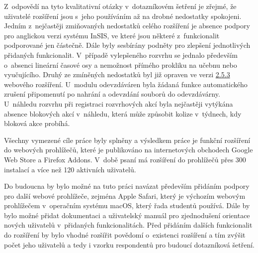 Z~odpovědí na tyto kvalitativní otázky v~dotazníkovém šetření je zřejmé, že uživatelé rozšíření jsou s~jeho používáním až na drobné nedostatky spokojeni. Jedním z~nejčastěji zmiňovaných nedostatků celého rozšíření je absence podpory pro anglickou verzi systému InSIS, ve které jsou některé z~funkcionalit podporované jen částečně. Dále byly sesbírány podněty pro zlepšení jednotlivých přidaných funkcionalit. V~případě vylepšeného rozvrhu se jednalo především o~absenci lineární časové osy a nemožnost přímého prokliku na učebnu nebo vyučujícího. Druhý ze zmíněných nedostatků byl již opraven ve verzi \href{https://gitlab.com/vse-plus/extension/-/releases/v2.5.3}{2.5.3} webového rozšíření. U~modulu odevzdáváren byla žádaná funkce automatického zrušení připomenutí po nahrání a odevzdání souborů do odevzdávárny. U~náhledu rozvrhu při registraci rozvrhových akcí byla nejčastěji vytýkána absence blokových akcí v~náhledu, která může způsobit kolize v~týdnech, kdy bloková akce probíhá.

Všechny vymezené cíle práce byly splněny a výsledkem práce je funkční rozšíření do webových prohlížečů, které je publikováno na internetových obchodech Google Web Store a Firefox Addons. V~době psaní má rozšíření do prohlížečů přes 300 instalací a více než 120 aktivních uživatelů. 

Do budoucna by bylo možné na tuto práci navázat především přidáním podpory pro další webové prohlížeče, zejména Apple Safari, který je výchozím webovým prohlížečem v~operačním systému macOS, který řada studentů používá. Dále by bylo možné přidat dokumentaci a uživatelský manuál pro zjednodušení orientace nových uživatelů v~přidaných funkcionalitách. Před přidáním dalších funkcionalit do rozšíření by bylo vhodné rozšířit povědomí o~existenci rozšíření a tím zvýšit počet jeho uživatelů a tedy i vzorku respondentů pro budoucí dotazníková šetření. 
